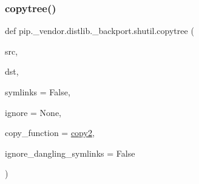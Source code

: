\subsubsection{\texorpdfstring{copytree()}{copytree()}}
{\footnotesize\ttfamily def pip.\+\_\+vendor.\+distlib.\+\_\+backport.\+shutil.\+copytree (\begin{DoxyParamCaption}\item[{}]{src,  }\item[{}]{dst,  }\item[{}]{symlinks = {\ttfamily False},  }\item[{}]{ignore = {\ttfamily None},  }\item[{}]{copy\+\_\+function = {\ttfamily \hyperlink{namespacepip_1_1__vendor_1_1distlib_1_1__backport_1_1shutil_af85eb3a739ebeb55736df79248341bb5}{copy2}},  }\item[{}]{ignore\+\_\+dangling\+\_\+symlinks = {\ttfamily False} }\end{DoxyParamCaption})}

